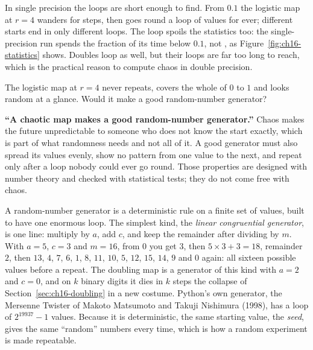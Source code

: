In single precision the loops are short enough to find. From $\num{0.1}$ the
logistic map at $r = 4$ wanders for  steps, then goes
round a loop of  values for ever; 
different starts end in only  different loops. The loop
spoils the statistics too: the single-precision run spends the fraction
 of its time below $\num{0.1}$, not
, as Figure~\ref{fig:ch16-statistics} shows. Doubles
loop as well, but their loops are far too long to reach, which is the
practical reason to compute chaos in double precision.

\begin{think}
The logistic map at $r = 4$ never repeats, covers the whole of $0$ to $1$ and
looks random at a glance. Would it make a good random-number generator?
\end{think}

\begin{trapbox}
\textbf{\enquote{A chaotic map makes a good random-number generator.}} Chaos
makes the future unpredictable to someone who does not know the start
exactly, which is part of what randomness needs and not all of it. A good
generator must also spread its values evenly, show no pattern from one value
to the next, and repeat only after a loop nobody could ever go round. Those
properties are designed with number theory and checked with statistical
tests; they do not come free with chaos.
\end{trapbox}

\noindent
A random-number generator is a deterministic rule on a finite set of values,
built to have one enormous loop. The simplest kind, the \emph{linear
congruential generator}, is one line: multiply by $a$, add $c$, and keep the
remainder after dividing by $m$. With $a = 5$, $c = 3$ and $m = 16$, from
$0$ you get $3$, then $5 \times 3 + 3 = 18$, remainder $2$, then $13$, $4$,
$7$, $6$, $1$, $8$, $11$, $10$, $5$, $12$, $15$, $14$, $9$ and $0$ again: all
sixteen possible values before a repeat. The doubling map is a generator of
this kind with $a = 2$ and $c = 0$, and on $k$ binary digits it dies in $k$
steps \dash{} the collapse of Section~\ref{sec:ch16-doubling} in a new
costume. Python's own generator, the Mersenne Twister of Makoto Matsumoto and
Takuji Nishimura (1998), has a loop of $2^{19937} - 1$ values. Because it is
deterministic, the same starting value, the \emph{seed}, gives the same
\enquote{random} numbers every time, which is how a random experiment is made
repeatable.

